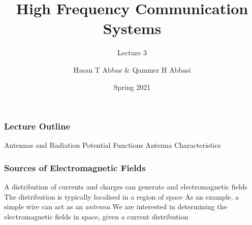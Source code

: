 \documentclass[10pt, compress]{beamer}
\title{High Frequency Communication Systems}
\subtitle{Lecture 3}
\date{Spring 2021}
\author{Hasan T Abbas \& Qammer H Abbasi}
\begin{document}
\maketitle

\begin{frame}[fragile]
  \frametitle{Lecture Outline}
  \begin{outline}[itemize]
    \1 Antennas and Radiation
    \1 Potential Functions
    \1 Antenna Characteristics
  \end{outline}
\end{frame}
\begin{frame}[fragile]
  \frametitle{Sources of Electromagnetic Fields}
  \begin{outline}
    \1 A distribution of currents and charges can generate and \color{red}{radiate} electromagnetic fields
    \2 The distribution is typically localised in a region of space
    \2 As an example, a simple wire can act as an \textit{antenna}
    \1 We are interested in determining the electromagnetic fields in space, given a current distribution
  \end{outline}
\end{frame}
\end{document}
